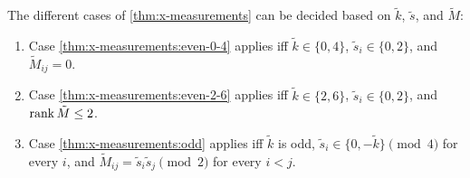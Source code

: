 \begin{proposition}\label{prop:x-measurement-case-decision}
    The different cases of \cref{thm:x-measurements} can be decided based on $\tilde k$, $\tilde s$, and $\tilde M$:
    \begin{enumerate}
        \item
        Case \ref{thm:x-measurements:even-0-4} applies iff $\tilde k \in \{0, 4\}$, $\tilde s_i \in \{0, 2\}$, and $\tilde M_{ij} = 0$.

        \item
        Case \ref{thm:x-measurements:even-2-6} applies iff $\tilde k \in \{2, 6\}$, $\tilde s_i \in \{0, 2\}$, and $\operatorname{rank} \tilde M \leq 2$.

        \item
        Case \ref{thm:x-measurements:odd} applies iff $\tilde k$ is odd,
        $\tilde s_i\in\{0,-\tilde k\}\pmod 4$ for every $i$, and
        $\tilde M_{ij}=\tilde s_i\tilde s_j\pmod 2$ for every $i<j$.
    \end{enumerate}
\end{proposition}
